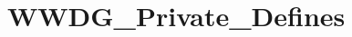 \hypertarget{group___w_w_d_g___private___defines}{\section{W\-W\-D\-G\-\_\-\-Private\-\_\-\-Defines}
\label{group___w_w_d_g___private___defines}
}
